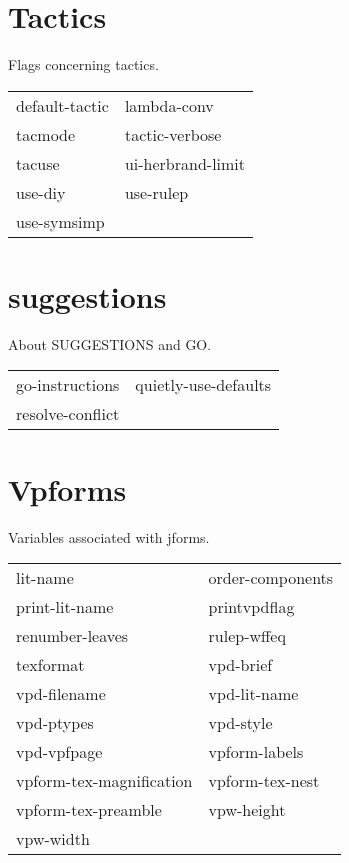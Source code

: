 \section{Tactics}

\begin{description} 
\item[TACTICS]  
Flags concerning tactics.

\begin{tabular}{l l}
default-tactic&lambda-conv\\
tacmode&tactic-verbose\\
tacuse&ui-herbrand-limit\\
use-diy&use-rulep\\
use-symsimp
\end{tabular}
\item
\end{description}

\section{suggestions}

\begin{description} 
\item[SUGGESTS]  
About SUGGESTIONS and GO.

\begin{tabular}{l l}
go-instructions&quietly-use-defaults\\
resolve-conflict
\end{tabular}
\item
\end{description}

\section{Vpforms}

\begin{description} 
\item[JFORMS]  
Variables associated with jforms.

\begin{tabular}{l l}
lit-name&order-components\\
print-lit-name&printvpdflag\\
renumber-leaves&rulep-wffeq\\
texformat&vpd-brief\\
vpd-filename&vpd-lit-name\\
vpd-ptypes&vpd-style\\
vpd-vpfpage&vpform-labels\\
vpform-tex-magnification&vpform-tex-nest\\
vpform-tex-preamble&vpw-height\\
vpw-width
\end{tabular}
\item
\end{description}

